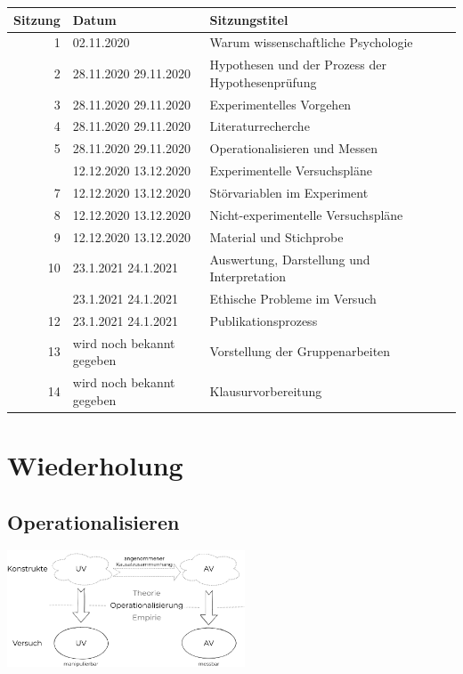 \documentclass[
]{book}
\begin{document}
\begin{tabular}[t]{rll}
\toprule
Sitzung & Datum & Sitzungstitel\\
\midrule
1 & 02.11.2020 & Warum wissenschaftliche Psychologie\\
2 & 28.11.2020
29.11.2020 & Hypothesen und der Prozess der Hypothesenprüfung\\
3 & 28.11.2020
29.11.2020 & Experimentelles Vorgehen\\
4 & 28.11.2020
29.11.2020 & Literaturrecherche\\
5 & 28.11.2020
29.11.2020 & Operationalisieren und Messen\\
\addlinespace
6 & 12.12.2020
13.12.2020 & Experimentelle Versuchspläne\\
7 & 12.12.2020
13.12.2020 & Störvariablen im Experiment\\
8 & 12.12.2020
13.12.2020 & Nicht-experimentelle Versuchspläne\\
9 & 12.12.2020
13.12.2020 & Material und Stichprobe\\
10 & 23.1.2021
24.1.2021 & Auswertung, Darstellung und Interpretation\\
\addlinespace
11 & 23.1.2021
24.1.2021 & Ethische Probleme im Versuch\\
12 & 23.1.2021
24.1.2021 & Publikationsprozess\\
13 & wird noch bekannt gegeben & Vorstellung der Gruppenarbeiten\\
14 & wird noch bekannt gegeben & Klausurvorbereitung\\
\bottomrule
\end{tabular}

\hypertarget{wiederholung-4}{%
\section{Wiederholung}\label{wiederholung-4}}

\hypertarget{operationalisieren}{%
\subsection{Operationalisieren}\label{operationalisieren}}

\begin{center}\includegraphics[width=200pt]{imgs/operartionalisierung} \end{center}
\end{document}
